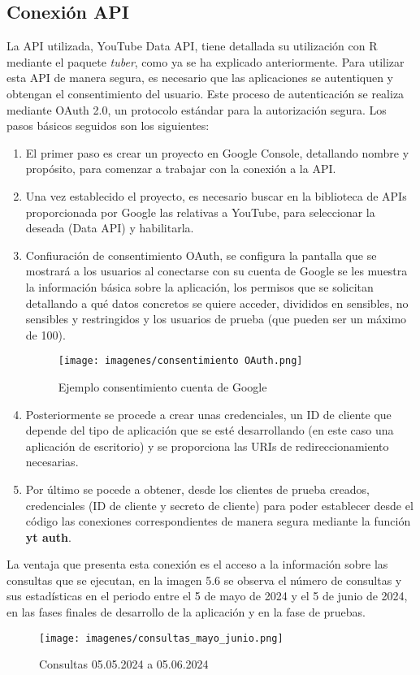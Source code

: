 \documentclass[a4paper,12pt,twoside]{memoir}
\begin{document}
\subsection{Conexión API} 
La API utilizada, YouTube Data API, tiene detallada su utilización con R mediante el paquete \textit{tuber}, como ya se ha explicado anteriormente. Para utilizar esta API de manera segura, es necesario que las aplicaciones se autentiquen y obtengan el consentimiento del usuario. Este proceso de autenticación se realiza mediante OAuth 2.0, un protocolo estándar para la autorización segura. Los pasos básicos seguidos son los siguientes:
\begin{enumerate}
    \item El primer paso es crear un proyecto en Google Console, detallando nombre y propósito, para comenzar a trabajar con la conexión a la API.
    \item Una vez establecido el proyecto, es necesario buscar en la biblioteca de APIs proporcionada por Google las relativas a YouTube, para seleccionar la deseada (Data API) y habilitarla.
    \item Confiuración de consentimiento OAuth, se configura la pantalla que se mostrará a los usuarios al conectarse con su cuenta de Google se les muestra la información básica sobre la aplicación, los permisos que se solicitan detallando a qué datos concretos se quiere acceder, divididos en sensibles, no sensibles y restringidos y los usuarios de prueba (que pueden ser un máximo de 100).
    \begin{figure}
    \centering
    \texttt{[image: imagenes/consentimiento OAuth.png]}
    \caption{Ejemplo consentimiento cuenta de Google}
    \label{fig:enter-label}
\end{figure}
    \item Posteriormente se procede a crear unas credenciales, un ID de cliente que depende del tipo de aplicación que se esté desarrollando (en este caso una aplicación de escritorio) y se proporciona las URIs de redireccionamiento necesarias.
    \item Por último se pocede a obtener, desde los clientes de prueba creados, credenciales (ID de cliente y secreto de cliente) para poder establecer desde el código las conexiones correspondientes de manera segura mediante la función \textbf{yt auth}.
\end{enumerate}
La ventaja que presenta esta conexión es el acceso a la información sobre las consultas que se ejecutan, en la imagen 5.6 se observa el número de consultas y sus estadísticas en el periodo entre el 5 de mayo de 2024 y el 5 de junio de 2024, en las fases finales de desarrollo de la aplicación y en la fase de pruebas.
\begin{figure}
    \centering
    \texttt{[image: imagenes/consultas\_mayo\_junio.png]}
    \caption{Consultas 05.05.2024 a 05.06.2024}
    \label{fig:enter-label}
\end{figure}
\end{document}
